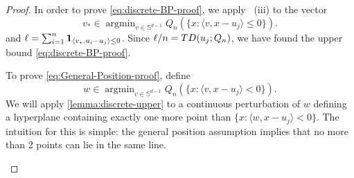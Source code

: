 \documentclass[10pt,a4paper]{amsart}
\DeclareMathOperator*{\argmin}{argmin}
\begin{document}
\begin{proof}
In order to prove \eqref{eq:discrete-BP-proof}, we apply ~(iii) to the vector 
%
$$v_*\in \argmin_{v\in \mathbb{S}^{d-1}} Q_n (\{ x: \langle v, x-u_j\rangle \leq  0\}).$$
%
and  $\ell=\sum_{i=1}^n {\bf 1}_{\langle v_*, u_i-u_j\rangle \leq  0}$. Since $\ell/n={\rm TD}(u_j; Q_n)$, we have found the upper bound \eqref{eq:discrete-BP-proof}. 

 To prove \eqref{eq:General-Position-proof}, define 
 $$w\in \argmin_{v\in \mathbb{S}^{d-1}} Q_n (\{ x: \langle v, x-u_j\rangle <  0\}).$$
 We will apply \cref{lemma:discrete-upper} to a  continuous perturbation of  $w$ defining a hyperplane containing exactly one more point than $\{ x: \langle w, x-u_j\rangle <  0\}$. The intuition for this is simple: the general position assumption implies that no more than 2 points can lie in the same line. 
 \begin{figure}[h!]
    \centering
    



\begin{tikzpicture}[x=0.6pt,y=0.6pt,yscale=-1,xscale=1]
%


\end{tikzpicture}
\end{figure}
\end{proof}
\end{document}
